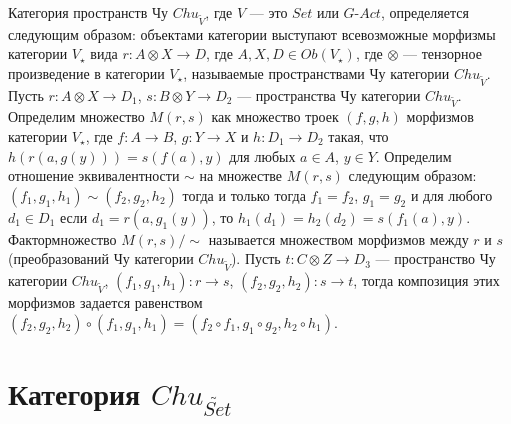 \documentclass[a4paper,12pt]{article}
\newcommand{\GAct}{G\text{-}Act}
\begin{document}
Категория пространств Чу $Chu_{\widetilde{V}}$, где $V$ --- это $Set$ или $\GAct$, определяется следующим образом: объектами категории выступают всевозможные морфизмы категории $V_{\star}$ вида $r: A \otimes X \to D$, где $A,X,D \in Ob(V_{\star})$, где $\otimes$ --- тензорное произведение в категории $V_{\star}$, называемые пространствами Чу категории $Chu_{\widetilde{V}}$. Пусть $r: A \otimes X \to D_1$, $s: B \otimes Y \to D_2$ --- пространства Чу категории $Chu_{\widetilde{V}}$. Определим множество $M(r,s)$ как множество троек $(f,g,h)$ морфизмов категории $V_{\star}$, где $f: A \to B$, $g: Y \to X$ и $h: D_1 \to D_2$ такая, что $h(r(a,g(y))) = s(f(a),y)$ для любых $a \in A$, $y \in Y$. Определим отношение эквивалентности $\sim$ на множестве $M(r,s)$ следующим образом: $(f_1,g_1,h_1) \sim (f_2,g_2,h_2)$ тогда и только тогда $f_1 = f_2$, $g_1 = g_2$ и для любого $d_1 \in D_1$ если $d_1 = r(a,g_1(y))$, то $h_1(d_1) = h_2(d_2) = s(f_1(a),y)$. Фактормножество $M(r,s)/\sim$ называется множеством морфизмов между $r$ и $s$ (преобразований Чу категории $Chu_{\widetilde{V}}$). Пусть $t: C \otimes Z \to D_3$ --- пространство Чу категории $Chu_{\widetilde{V}}$, $(f_1,g_1,h_1): r \to s$, $(f_2,g_2,h_2): s \to t$, тогда композиция этих морфизмов задается равенством $(f_2,g_2,h_2) \circ (f_1,g_1,h_1) = (f_2 \circ f_1, g_1 \circ g_2, h_2 \circ h_1)$.

\section*{Категория $Chu_{\widetilde{Set}}$}
\end{document}

